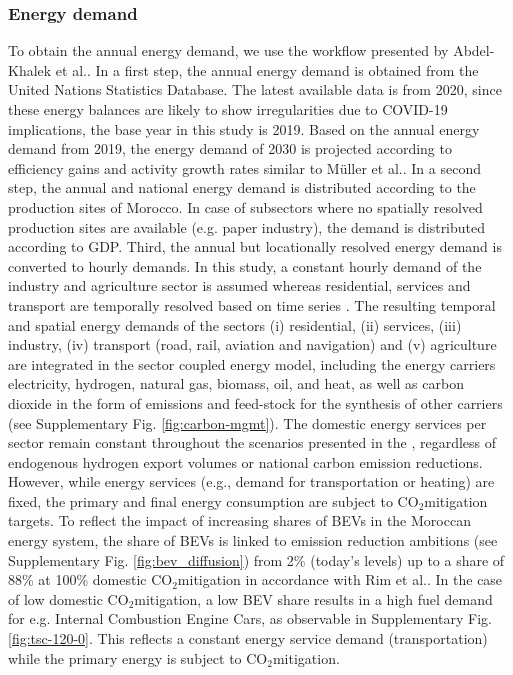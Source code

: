 \documentclass[5p,numafflabel]{elsarticle}
\newcommand{\co}{\ce{CO2}~}
\def\co{CO${}_2${\:}}
\begin{document}
\subsubsection*{Energy demand}
To obtain the annual energy demand, we use the workflow presented by Abdel-Khalek et al.\cite{Abdel-Khalek2025}. In a first step, the annual energy demand is obtained from the United Nations Statistics Database\cite{unstats2023}. The latest available data is from 2020, since these energy balances are likely to show irregularities due to COVID-19 implications, the base year in this study is 2019. Based on the annual energy demand from 2019, the energy demand of 2030 is projected according to efficiency gains and activity growth rates similar to M{\"u}ller et al.\cite{Muller2023}.
In a second step, the annual and national energy demand is distributed according to the production sites of Morocco.
In case of subsectors where no spatially resolved production sites are available (e.g. paper industry), the demand is distributed according to GDP.
Third, the annual but locationally resolved energy demand is converted to hourly demands. In this study, a constant hourly demand of the industry and agriculture sector is assumed whereas residential, services and transport are temporally resolved based on time series \cite{Brown2018a,Neumann2023,Abdel-Khalek2025}. 
The resulting temporal and spatial energy demands of the sectors
(i) residential,
(ii) services,
(iii) industry,
(iv) transport (road, rail, aviation and navigation) and
(v) agriculture
are integrated in the sector coupled energy model, including the energy carriers electricity, hydrogen, natural gas, biomass, oil, and heat, as well as carbon dioxide in the form of emissions and feed-stock for the synthesis of other carriers (see Supplementary Fig. \ref{fig:carbon-mgmt}). 
The domestic energy services per sector remain constant throughout the scenarios presented in the , regardless of endogenous hydrogen export volumes or national carbon emission reductions. However, while energy services (e.g., demand for transportation or heating) are fixed, the primary and final energy consumption are subject to \co mitigation targets. To reflect the impact of increasing shares of BEVs in the Moroccan energy system, the share of BEVs is linked to emission reduction ambitions (see Supplementary Fig. \ref{fig:bev_diffusion}) from 2\% (today's levels) up to a share of 88\% at 100\% domestic \co mitigation in accordance with Rim et al.\cite{Rim2021}.
In the case of low domestic \co mitigation, a low BEV share results in a high fuel demand for e.g. Internal Combustion Engine Cars, as observable in Supplementary Fig. \ref{fig:tsc-120-0}. This reflects a constant energy service demand (transportation) while the primary energy is subject to \co mitigation.
\end{document}
